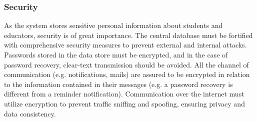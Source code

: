 \subsubsection{Security}
As the system stores sensitive personal information about students and educators, security is of great importance. The central database must be fortified with comprehensive security measures to prevent external and internal attacks. Passwords stored in the data store must be encrypted, and in the case of password recovery, clear-text transmission should be avoided. All the channel of communication (e.g. notifications, mails) are assured to be encrypted in relation to the information contained in their messages (e.g. a password recovery is different from a reminder notification). Communication over the internet must utilize encryption to prevent traffic sniffing and spoofing, ensuring privacy and data consistency. 

